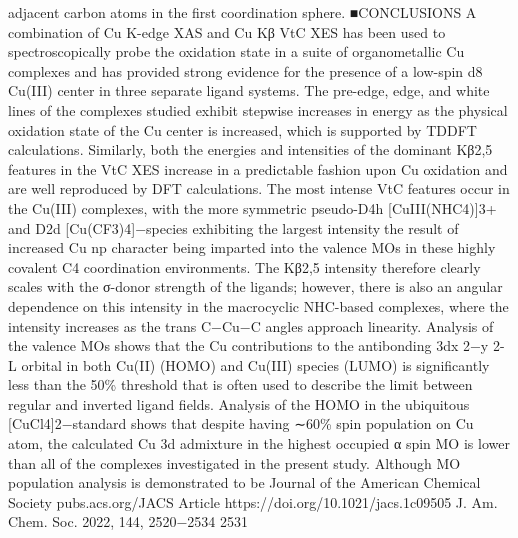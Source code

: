 \documentclass{article}
\begin{document}
adjacent carbon atoms in the ﬁrst coordination sphere.
■CONCLUSIONS
A combination of Cu K-edge XAS and Cu Kβ VtC XES has
been used to spectroscopically probe the oxidation state in a
suite of organometallic Cu complexes and has provided strong
evidence for the presence of a low-spin d8 Cu(III) center in
three separate ligand systems. The pre-edge, edge, and white
lines of the complexes studied exhibit stepwise increases in
energy as the physical oxidation state of the Cu center is
increased, which is supported by TDDFT calculations.
Similarly, both the energies and intensities of the dominant
Kβ2,5 features in the VtC XES increase in a predictable fashion
upon Cu oxidation and are well reproduced by DFT
calculations. The most intense VtC features occur in the
Cu(III) complexes, with the more symmetric pseudo-D4h
[CuIII(NHC4)]3+ and D2d [Cu(CF3)4]−species exhibiting the
largest intensitythe result of increased Cu np character being
imparted into the valence MOs in these highly covalent C4
coordination environments. The Kβ2,5 intensity therefore
clearly scales with the σ-donor strength of the ligands;
however, there is also an angular dependence on this intensity
in the macrocyclic NHC-based complexes, where the intensity
increases as the trans C−Cu−C angles approach linearity.
Analysis of the valence MOs shows that the Cu
contributions to the antibonding 3dx
2−y
2-L orbital in both
Cu(II) (HOMO) and Cu(III) species (LUMO) is signiﬁcantly
less than the 50\% threshold that is often used to describe the
limit between regular and inverted ligand ﬁelds. Analysis of the
HOMO in the ubiquitous [CuCl4]2−standard shows that
despite having ∼60\% spin population on Cu atom, the
calculated Cu 3d admixture in the highest occupied α spin MO
is lower than all of the complexes investigated in the present
study. Although MO population analysis is demonstrated to be
Journal of the American Chemical Society
pubs.acs.org/JACS
Article
https://doi.org/10.1021/jacs.1c09505
J. Am. Chem. Soc. 2022, 144, 2520−2534
2531

\newpage

\end{document}
